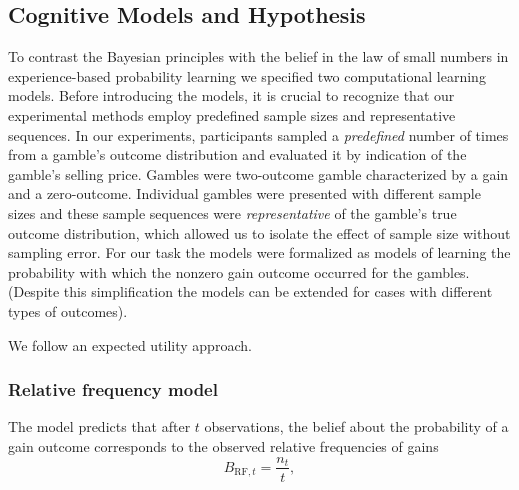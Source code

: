 \documentclass[a4paper, man, natbib, floatsintext]{apa6}
\begin{document}
\subsection{Cognitive Models and Hypothesis}
To contrast the Bayesian principles with the belief in the law of small numbers in experience-based probability learning we specified two computational learning models. Before introducing the models, it is crucial to recognize that our experimental methods employ predefined sample sizes and representative sequences. In our experiments, participants sampled a \textit{predefined} number of times from a gamble's outcome distribution and evaluated it by indication of the gamble's selling price. Gambles were two-outcome gamble characterized by a gain and a zero-outcome. Individual gambles were presented with different sample sizes and these sample sequences were \textit{representative} of the gamble's true outcome distribution, which allowed us to isolate the effect of sample size without sampling error. For our task the models were formalized as models of learning the probability with which the nonzero gain outcome occurred for the gambles. (Despite this simplification the models can be extended for cases with different types of outcomes).

We follow an expected utility approach. 

\subsubsection{Relative frequency model}

 The model predicts that after $t$ observations, the belief about the probability of a gain outcome corresponds to the observed relative frequencies of gains
$${B}_{\mathrm{RF}, t}  =  \frac{n_t}{t} ,$$
\end{document}
